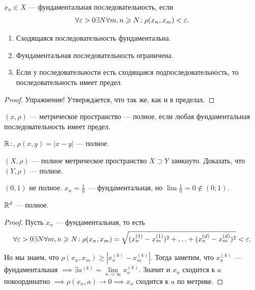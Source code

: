 \begin{definition}
    $x_n \in X$ --- фундаментальная последовательность, если
     \[
    \forall \varepsilon > 0 \exists N \forall m, n \geqslant N\!: \rho(x_n, x_m) < \varepsilon
    .\] 
\end{definition}
\begin{properties}
    \begin{enumerate}
        \item Сходящаяся последовательность фундаментальна.
        \item Фундаментальная последовательность ограничена.
        \item Если у последовательности есть сходящаяся подпоследовательность, то последовательность имеет предел.
    \end{enumerate}
\end{properties}
\begin{proof}
    Упражнение! Утверждается, что так же, как и в пределах.
\end{proof}
\begin{definition}
    $(x, \rho)$ --- метрическое пространство --- полное, если любая фундаментальная последовательность имеет предел.
\end{definition}
\begin{example}
    $\mathbb{R}\!:$,  $\rho(x, y) = |x-y|$ --- полное.
\end{example}
\begin{exerc}
    $(X, \rho)$ --- полное метрическое пространство  $X \supset Y$ замкнуто. Доказать, что  $(Y, \rho)$ --- полное.
\end{exerc}
\begin{exerc}
    $(0, 1)$ не полное.  $x_n = \frac{1}{n}$ --- фундаментальная, но $\lim \frac{1}{n} = 0 \notin (0; 1)$.
\end{exerc}
\begin{theorem}
    $\mathbb{R}^d$ --- полное.
\end{theorem}
\begin{proof}
    Пусть $x_n$ --- фундаментальная, то есть
     \[
    \forall \varepsilon > 0 \exists N \forall m,n \geqslant N\!: \rho(x_n, x_m) = \sqrt{(x_n^{(1)}-x_m^{(1)})^2 + \ldots + (x_n^{(d)}-x_m^{(d)})^2} < \varepsilon
    .\] 

    Но мы знаем, что $\rho(x_n, x_m) \ge |x_n^{(k)} - x_m^{(k)}|$. Тогда заметим, что $x_n^{(k)}$ --- фундаментальная  $\implies \exists a^{(k)} = \lim\limits_{n \to \infty} x_n^{(k)}$. Значит и  $x_n$ сходится к  $a$ покоординатно  $\implies \rho(x_n, a) \to 0 \implies x_n$ сходится к  $a$ по метрике.
\end{proof}
